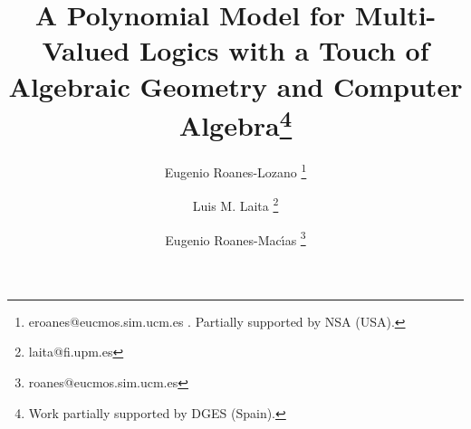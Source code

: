 
\title{A Polynomial Model for Multi-Valued Logics with a Touch of Algebraic
       Geometry and Computer
       Algebra\footnote{Work partially supported by DGES (Spain).}}

\author{Eugenio Roanes-Lozano
        \thanks{eroanes@eucmos.sim.ucm.es .
        Partially supported by NSA (USA).} \and
        Luis M. Laita  \thanks{laita@fi.upm.es}   \and
        Eugenio Roanes-Mac\'{\i}as \thanks{roanes@eucmos.sim.ucm.es}
        }

\date{}

\newtheorem{entorno}{}[subsection]
\newenvironment{teor}{\begin {entorno} {\bf Theorem.-}}{\end{entorno}}
\newenvironment{prop}{\begin {entorno} {\bf Proposition.-}}{\end{entorno}}
\newenvironment{defi}{\begin {entorno} {\bf Definition.-}}{\end{entorno}}
\newenvironment{ej}{\begin {entorno} {\bf Example.-}}{\end{entorno}}
\newenvironment{obs}{\begin {entorno} {\bf Remark.-}}{\end{entorno}}
\newenvironment{consec}{\begin {entorno} {\bf Consequence.-}}{\end{entorno}}
\newenvironment{lema}{\begin {entorno} {\bf Lemma.-}}{\end{entorno}}
\newenvironment{axis}{\begin {entorno} {\bf Axioms.-}}{\end{entorno}}
\newenvironment{axi}{\begin {entorno} {\bf Axiom.-}}{\end{entorno}}
\newcommand{\NN}{\mbox{{\sl I}}\!\mbox{{\sl N}}}  %
\newcommand{\RR}{\mbox{{\sl I}}\!\mbox{{\sl R}}}  %
\newcommand{\ZZ}{\mbox{{\sl Z}}\!\!\mbox{{\sl Z}}}  %



